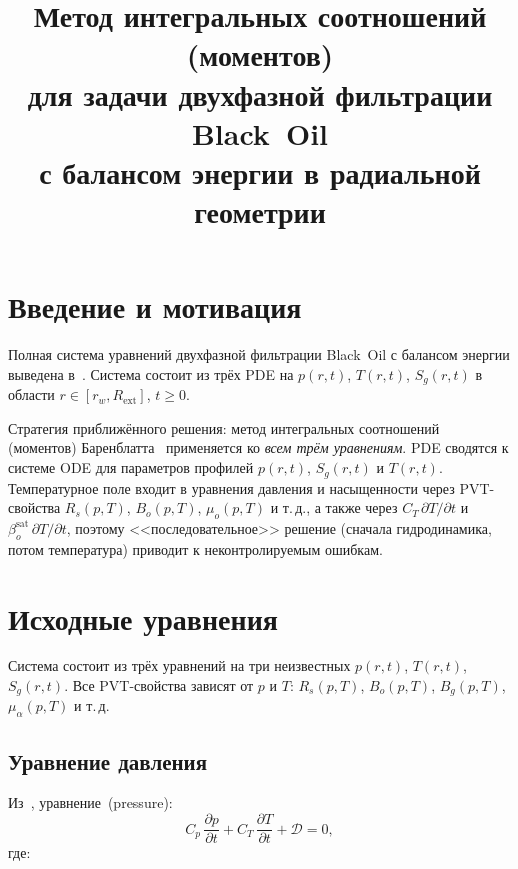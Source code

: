\documentclass[12pt,a4paper]{article}
\title{Метод интегральных соотношений (моментов)\\
для задачи двухфазной фильтрации Black~Oil\\
с балансом энергии в радиальной геометрии}
\author{}
\date{}
\newcommand{\pp}{\partial}
\newcommand{\ext}{\mathrm{ext}}
\newcommand{\sat}{\mathrm{sat}}
\begin{document}
\maketitle
\tableofcontents
\newpage

\section{Введение и мотивация}\label{sec:intro}

Полная система уравнений двухфазной фильтрации Black~Oil с балансом
энергии выведена в~\cite{draft4}. Система состоит из трёх PDE
на $p(r,t)$, $T(r,t)$, $S_g(r,t)$ в области $r\in[r_w, R_\ext]$,
$t \geqslant 0$.

Стратегия приближённого решения: метод интегральных соотношений
(моментов) Баренблатта~\cite{barenblatt1954} применяется ко
\emph{всем трём уравнениям}. PDE сводятся к системе ODE для
параметров профилей $p(r,t)$, $S_g(r,t)$ и $T(r,t)$.
Температурное поле входит в уравнения давления и
насыщенности через PVT-свойства $R_s(p,T)$, $B_o(p,T)$,
$\mu_o(p,T)$ и т.\,д., а также через
$C_T\,\pp T/\pp t$ и $\beta_o^\sat\,\pp T/\pp t$,
поэтому <<последовательное>> решение
(сначала гидродинамика, потом температура) приводит
к неконтролируемым ошибкам.


\section{Исходные уравнения}\label{sec:equations}

Система состоит из трёх уравнений на три неизвестных
$p(r,t)$, $T(r,t)$, $S_g(r,t)$. Все PVT-свойства зависят
от $p$ и $T$: $R_s(p,T)$, $B_o(p,T)$, $B_g(p,T)$,
$\mu_\alpha(p,T)$ и т.\,д.

\subsection{Уравнение давления}

Из~\cite{draft4}, уравнение~(pressure):
\begin{equation}\label{eq:p_eq}
  \boxed{
    C_p\,\frac{\pp p}{\pp t}
    + C_T\,\frac{\pp T}{\pp t}
    + \mathcal{D} = 0,
  }
\end{equation}
где:
\end{document}
